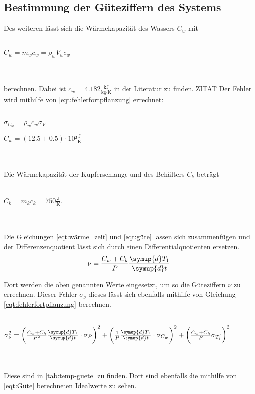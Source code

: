 \subsection{Bestimmung der Güteziffern des Systems}

Des weiteren lässt sich die Wärmekapazität des Wassers $C_w$ mit
\\ \\
\centerline{$C_w = m_w c_w = \rho_w V_w c_w$}
\\ \\
berechnen. Dabei ist $c_w = 4.182 \frac{\textrm{kJ}}{\textrm{kg$\cdot$K}}$ in der Literatur zu finden. ZITAT
Der Fehler wird mithilfe von \eqref{eqt:fehlerfortpflanzung} errechnet:
\\ \\
\centerline{$\sigma_\text{$C_w$} = \rho_w c_w \sigma_V$}
\centerline{$C_w = (12.5 \pm 0.5) \cdot 10³ \frac{\textrm{J}}{\textrm{K}}$}
\\ \\
Die Wärmekapazität der Kupferschlange und des Behälters $C_k$ beträgt 
\\ \\
\centerline{$C_k = m_k c_k = 750 \frac{\textrm{J}}{\textrm{K}}$.}
\\ \\
Die Gleichungen \eqref{eqt:wärme_zeit} und \eqref{eqt:güte} lassen sich zusammenfügen und der Differenzenquotient lässt sich durch einen Differentialquotienten ersetzen.
\begin{equation}
  \nu = \frac{C_w + C_k}{P} \frac{\symup{d}T_1}{\symup{d}t}
\end{equation}

Dort werden die oben genannten Werte eingesetzt, um so die Güteziffern $\nu$ zu errechnen. 
Dieser Fehler $\sigma_\nu$ dieses lässt sich ebenfalls mithilfe von Gleichung \eqref{eqt:fehlerfortpflanzung} berechnen.
\\ \\
\centerline{$\sigma_\nu^2 = \bigg( \frac{C_w + C_k}{P^2} \frac{\symup{d}T_1}{\symup{d}t} \cdot \sigma_P \bigg)^2 + 
  \bigg( \frac{1}{P} \frac{\symup{d}T_1}{\symup{d}t} \cdot \sigma_\text{$C_w$} \bigg)^2 + 
  \bigg( \frac{C_w + C_k}{P} \sigma_\text{$T'_1$} \bigg)^2$}
\\ \\
Diese sind in \autoref{tab:temp-guete} zu finden. Dort sind ebenfalls die mithilfe von \eqref{eqt:Güte} berechneten Idealwerte zu sehen.

